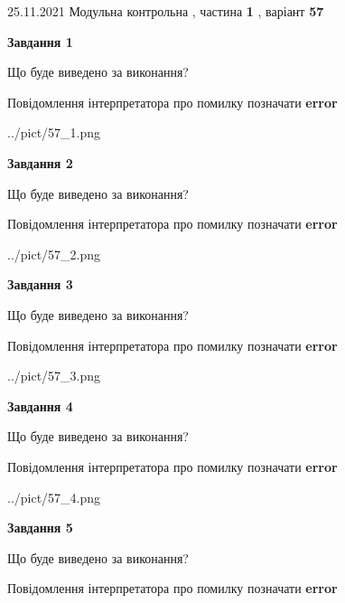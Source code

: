 \documentclass[10pt, ukrainian]{article}
\begin{document}
{25.11.2021 Модульна контрольна , частина \textbf { 1 }, варіант  \No \textbf { 57 }\par}
{
\begin {large}

{\begin {center}\textbf{Завдання 1}\end {center}}\par
Що буде виведено за виконання? \par
Повідомлення інтерпретатора про помилку позначати \textbf{error}

\begin{center}
	{../pict/57_1.png}
\end{center}
\newpage

{\begin {center}\textbf{Завдання 2}\end {center}}\par
Що буде виведено за виконання? \par
Повідомлення інтерпретатора про помилку позначати \textbf{error}

\begin{center}
	{../pict/57_2.png}
\end{center}
\newpage

{\begin {center}\textbf{Завдання 3}\end {center}}\par
Що буде виведено за виконання? \par
Повідомлення інтерпретатора про помилку позначати \textbf{error}

\begin{center}
	{../pict/57_3.png}
\end{center}
\newpage

{\begin {center}\textbf{Завдання 4}\end {center}}\par
Що буде виведено за виконання? \par
Повідомлення інтерпретатора про помилку позначати \textbf{error}

\begin{center}
	{../pict/57_4.png}
\end{center}
\newpage

{\begin {center}\textbf{Завдання 5}\end {center}}\par
Що буде виведено за виконання? \par
Повідомлення інтерпретатора про помилку позначати \textbf{error}


\end{large}}
\end{document}
